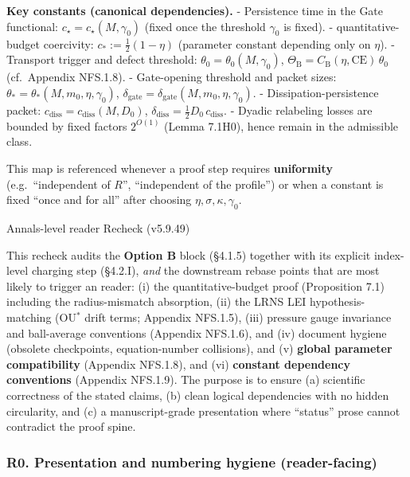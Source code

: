 \documentclass[
  11pt,
]{article}
\begin{document}
\textbf{Key constants (canonical dependencies).} - Persistence time in the Gate functional: \(c_\star=c_\star(M,\gamma_0)\) (fixed once the threshold \(\gamma_0\) is fixed). - quantitative-budget coercivity: \(c_*:=\tfrac12(1-\eta)\) (parameter constant depending only on \(\eta\)). - Transport trigger and defect threshold: \(\theta_0=\theta_0(M,\gamma_0)\), \(\Theta_{\mathrm{B}}=C_{\mathrm{B}}(\eta,\mathrm{CE})\,\theta_0\) (cf.~Appendix NFS.1.8). - Gate-opening threshold and packet sizes: \(\theta_* = \theta_*(M,m_0,\eta,\gamma_0)\), \(\delta_{\mathrm{gate}} = \delta_{\mathrm{gate}}(M,m_0,\eta,\gamma_0)\). - Dissipation-persistence packet: \(c_{\mathrm{diss}}=c_{\mathrm{diss}}(M,D_0)\), \(\delta_{\mathrm{diss}}=\tfrac12 D_0\,c_{\mathrm{diss}}\). - Dyadic relabeling losses are bounded by fixed factors \(2^{O(1)}\) (Lemma 7.1H0), hence remain in the admissible class.

This map is referenced whenever a proof step requires \textbf{uniformity} (e.g.~``independent of \(R\)'', ``independent of the profile'') or when a constant is fixed ``once and for all'' after choosing \(\eta,\sigma,\kappa,\gamma_0\).

Annals-level reader Recheck (v5.9.49)

This recheck audits the \textbf{Option B} block (§4.1.5) together with its explicit index-level charging step (§4.2.I), \emph{and} the downstream rebase points that are most likely to trigger an reader: (i) the quantitative-budget proof (Proposition 7.1) including the radius-mismatch absorption, (ii) the LRNS LEI hypothesis-matching (OU\(^\ast\) drift terms; Appendix NFS.1.5), (iii) pressure gauge invariance and ball-average conventions (Appendix NFS.1.6), and (iv) document hygiene (obsolete checkpoints, equation-number collisions), and (v) \textbf{global parameter compatibility} (Appendix NFS.1.8), and (vi) \textbf{constant dependency conventions} (Appendix NFS.1.9). The purpose is to ensure (a) scientific correctness of the stated claims, (b) clean logical dependencies with no hidden circularity, and (c) a manuscript-grade presentation where ``status'' prose cannot contradict the proof spine.

\hypertarget{r0.-presentation-and-numbering-hygiene-reader-facing}{%
\subsubsection{R0. Presentation and numbering hygiene (reader-facing)}\label{r0.-presentation-and-numbering-hygiene-reader-facing}}
\end{document}
